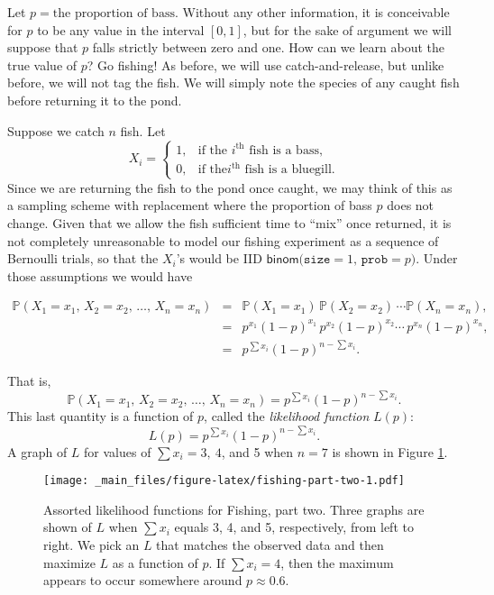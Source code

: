 \documentclass[]{book}
\numberwithin{equation}{chapter}
\numberwithin{figure}{chapter}
\theoremstyle{plain}
\theoremstyle{definition}
\theoremstyle{remark}
\theoremstyle{definition}
\theoremstyle{definition}
\theoremstyle{remark}
\begin{document}
Let \(p=\mbox{the proportion of bass}\). Without any other information,
it is conceivable for \(p\) to be any value in the interval \([0,1]\),
but for the sake of argument we will suppose that \(p\) falls strictly
between zero and one. How can we learn about the true value of \(p\)? Go
fishing! As before, we will use catch-and-release, but unlike before, we
will not tag the fish. We will simply note the species of any caught
fish before returning it to the pond.

Suppose we catch \(n\) fish. Let \[ X_{i} = \begin{cases} 1, &
\mbox{if the \(i^{\text{th}}\) fish is a bass,}\\ 0, & \mbox{if the
\(i^{\text{th}}\) fish is a bluegill.} \end{cases} \] Since we are
returning the fish to the pond once caught, we may think of this as a
sampling scheme with replacement where the proportion of bass \(p\) does
not change. Given that we allow the fish sufficient time to ``mix'' once
returned, it is not completely unreasonable to model our fishing
experiment as a sequence of Bernoulli trials, so that the \(X_{i}\)'s
would be IID \(\mathsf{binom(\mathtt{size}}=1,\,\mathtt{prob}=p)\).
Under those assumptions we would have

\begin{eqnarray*}
\mathbb{P}(X_{1}=x_{1},\, X_{2}=x_{2},\,\ldots,\, X_{n}=x_{n}) & = & \mathbb{P}(X_{1}=x_{1})\,\mathbb{P}(X_{2}=x_{2})\,\cdots\mathbb{P}(X_{n}=x_{n}),\\
 & = & p^{x_{1}}(1-p)^{x_{1}}\, p^{x_{2}}(1-p)^{x_{2}}\cdots\, p^{x_{n}}(1-p)^{x_{n}},\\
 & = & p^{\sum x_{i}}(1-p)^{n-\sum x_{i}}.
\end{eqnarray*}

That is, \[ \mathbb{P}(X_{1}=x_{1},\, X_{2}=x_{2},\,\ldots,\,
X_{n}=x_{n})=p^{\sum x_{i}}(1-p)^{n-\sum x_{i}}.  \] This last quantity
is a function of \(p\), called the \emph{likelihood function} \(L(p)\):
\[ L(p)=p^{\sum x_{i}}(1-p)^{n-\sum x_{i}}.  \] A graph of \(L\) for
values of \(\sum x_{i}=3,\ 4\), and 5 when \(n=7\) is shown in Figure
\ref{fig:fishing-part-two}.

\begin{figure}[htbp]
\centering
\texttt{[image: \_main\_files/figure-latex/fishing-part-two-1.pdf]}
\caption{\label{fig:fishing-part-two}\small Assorted likelihood functions for
Fishing, part two. Three graphs are shown of \(L\) when \(\sum x_{i}\)
equals 3, 4, and 5, respectively, from left to right. We pick an \(L\)
that matches the observed data and then maximize \(L\) as a function of
\(p\). If \(\sum x_{i}=4\), then the maximum appears to occur somewhere
around \(p \approx 0.6\).}
\end{figure}
\end{document}
